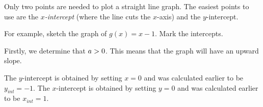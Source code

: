           \label{m39338*id239497}Only two points are needed to plot a straight line graph. The easiest points to use are the \textsl{\begin{math}x\end{math}-intercept} (where the line cuts the \begin{math}x\end{math}-axis) and the \begin{math}y\end{math}-intercept.\par 
          \label{m39338*id239534}For example, sketch the graph of \begin{math}g\left(x\right)=x-1\end{math}. Mark the intercepts.\par 
          \label{m39338*id239565}Firstly, we determine that \begin{math}a>{}0\end{math}. This means that the graph will have an upward slope.\par 
          \label{m39338*id239585}The \begin{math}y\end{math}-intercept is obtained by setting \begin{math}x=0\end{math} and was calculated earlier to be \begin{math}{y}_{int}=-1\end{math}. The \begin{math}x\end{math}-intercept is obtained by setting \begin{math}y=0\end{math} and was calculated earlier to be \begin{math}{x}_{int}=1\end{math}.\par 
          
    \setcounter{subfigure}{0}


